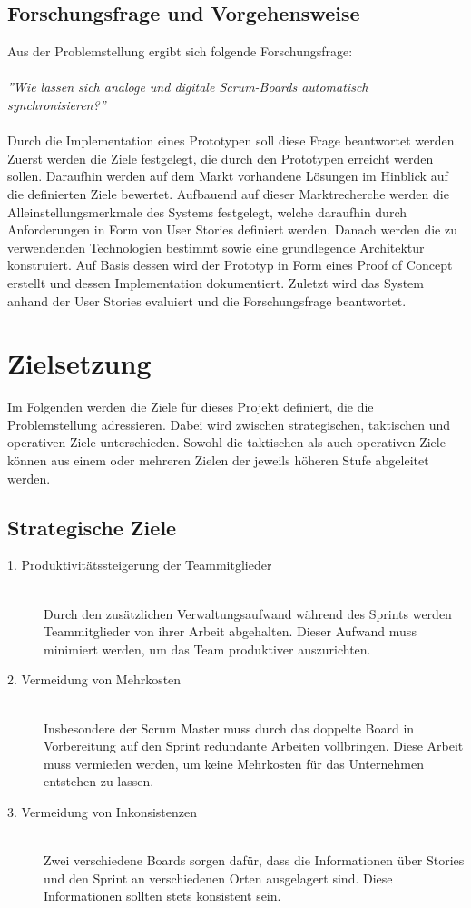 \documentclass[12pt,titlepage]{scrartcl}
\begin{document}
		\subsection{Forschungsfrage und Vorgehensweise} \label{Forschungsfrage}
		Aus der Problemstellung ergibt sich folgende Forschungsfrage: \\ \\
		\textit{''Wie lassen sich analoge und digitale Scrum-Boards automatisch synchronisieren?''} \\ \\
		Durch die Implementation eines Prototypen soll diese Frage beantwortet werden. Zuerst werden die Ziele festgelegt, die durch den Prototypen erreicht werden sollen. Daraufhin werden auf dem Markt vorhandene Lösungen im Hinblick auf die definierten Ziele bewertet. Aufbauend auf dieser Marktrecherche werden die Alleinstellungsmerkmale des Systems festgelegt, welche daraufhin durch Anforderungen in Form von User Stories definiert werden. Danach werden die zu verwendenden Technologien bestimmt sowie eine grundlegende Architektur konstruiert. Auf Basis dessen wird der Prototyp in Form eines Proof of Concept erstellt und dessen Implementation dokumentiert. Zuletzt wird das System anhand der User Stories evaluiert und die Forschungsfrage beantwortet.
	\newpage	
	\section{Zielsetzung} \label{Zielsetzung}
	Im Folgenden werden die Ziele für dieses Projekt definiert, die die Problemstellung adressieren. Dabei wird zwischen strategischen, taktischen und operativen Ziele unterschieden. Sowohl die taktischen als auch operativen Ziele können aus einem oder mehreren Zielen der jeweils höheren Stufe abgeleitet werden.
		\subsection{Strategische Ziele}
		\begin{description}
 			\item[1. Produktivitätssteigerung der Teammitglieder] \hfill \\
 			Durch den zusätzlichen Verwaltungsaufwand während des Sprints werden Teammitglieder von ihrer Arbeit abgehalten. Dieser Aufwand muss minimiert werden, um das Team produktiver auszurichten.
 			\item[2. Vermeidung von Mehrkosten] \hfill \\
 			Insbesondere der Scrum Master muss durch das doppelte Board in Vorbereitung auf den Sprint redundante Arbeiten vollbringen. Diese Arbeit muss vermieden werden, um keine Mehrkosten für das Unternehmen entstehen zu lassen.
 			\item[3. Vermeidung von Inkonsistenzen] \hfill \\
 			Zwei verschiedene Boards sorgen dafür, dass die Informationen über Stories und den Sprint an verschiedenen Orten ausgelagert sind. Diese Informationen sollten stets konsistent sein. 
		\end{description}
\end{document}
